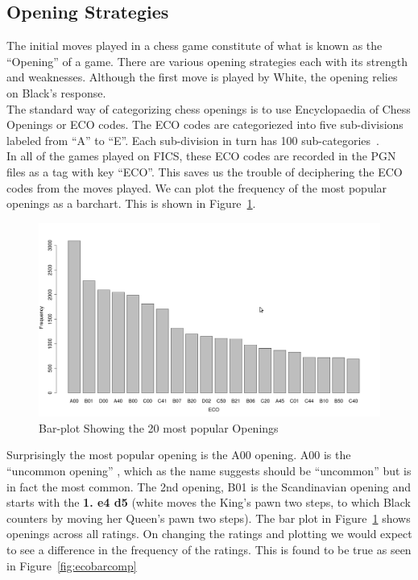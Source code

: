 \documentclass{article}
\begin{document}
\clearpage
\subsection{Opening Strategies}
The initial moves played in a chess game constitute of what is known as the ``Opening'' of a game. There are various opening strategies each with its strength and weaknesses. Although the first move is played by White, the opening relies on Black's response.\\

The standard way of categorizing chess openings is to use Encyclopaedia of Chess Openings or ECO codes. The ECO codes are categoriezed into five sub-divisions labeled from ``A'' to ``E''. Each sub-division in turn has 100 sub-categories~\cite{wiki:eco}.\\

In all of the games played on FICS, these ECO codes are recorded in the PGN files as a tag with key ``ECO''. This saves us the trouble of deciphering the ECO codes from the moves played. We can plot the frequency of the most popular openings as a barchart. This is shown in Figure~\ref{fig:ecobar}.

\begin{figure} [htp]
\begin{center}
\includegraphics[width=5in]{eco_bar.png}
\end{center}
\caption{Bar-plot Showing the 20 most popular Openings}
\label{fig:ecobar}
\end{figure}

Surprisingly the most popular opening is the A00 opening. A00 is the ``uncommon opening'' , which as the name suggests should be ``uncommon'' but is in fact the most common. The 2nd opening, B01 is the Scandinavian opening and starts with the {\bf 1. e4 d5} (white moves the King's pawn two steps, to which Black counters by moving her Queen's pawn two steps). The bar plot in Figure~\ref{fig:ecobar} shows openings across all ratings. On changing the ratings and plotting we would expect to see a difference in the frequency of the ratings. This is found to be true as seen in Figure~\ref{fig:ecobarcomp}
\end{document}
